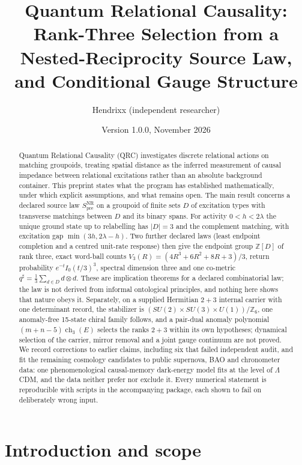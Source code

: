 \documentclass[11pt]{article}
\title{Quantum Relational Causality: Rank-Three Selection from a\\
Nested-Reciprocity Source Law, and Conditional Gauge Structure}
\author{Hendrixx (independent researcher)}
\date{Version 1.0.0, November 2026}
\theoremstyle{definition}
\theoremstyle{remark}
\newcommand{\Spre}{S^{\mathrm{NR}}_{\mathrm{pre}}}
\newcommand{\Z}{\mathbb{Z}}
\newcommand{\ch}{\operatorname{ch}}
\begin{document}
\maketitle

\begin{abstract}
Quantum Relational Causality (QRC) investigates discrete relational actions on matching
groupoids, treating spatial distance as the inferred measurement of causal impedance
between relational excitations rather than an absolute background container. This preprint
states what the program has established mathematically, under which explicit assumptions,
and what remains open. The main result concerns a declared source law $\Spre$ on a groupoid
of finite sets $D$ of excitation types with transverse matchings between $D$ and its binary
spans. For activity $0<h<2\lambda$ the unique ground state up to relabelling has $|D|=3$
and the complement matching, with excitation gap $\min(3h,2\lambda-h)$. Two further declared
laws (least endpoint completion and a centred unit-rate response) then give the endpoint group
$\Z[D]$ of rank three, exact word-ball counts $V_3(R)=(4R^3+6R^2+8R+3)/3$, return
probability $e^{-t}I_0(t/3)^3$, spectral dimension three and one co-metric
$q^\sharp=\tfrac13\sum_{d\in D}d\otimes d$. These are implication theorems for a declared
combinatorial law; the law is not derived from informal ontological principles, and nothing
here shows that nature obeys it. Separately, on a supplied Hermitian $2+3$ internal carrier
with one determinant record, the stabilizer is $(SU(2)\times SU(3)\times U(1))/\Z_6$, one
anomaly-free 15-state chiral family follows, and a pair-dual anomaly polynomial
$(m+n-5)\ch_3(E)$ selects the ranks $2+3$ within its own hypotheses; dynamical selection
of the carrier, mirror removal and a joint gauge continuum are not proved. We record
corrections to earlier claims, including six that failed independent audit, and fit the
remaining cosmology candidates to public supernova, BAO and chronometer data: one
phenomenological causal-memory dark-energy model fits at the level of $\Lambda$CDM, and
the data neither prefer nor exclude it. Every numerical statement is reproducible with
scripts in the accompanying package, each shown to fail on deliberately wrong input.
\end{abstract}

\section{Introduction and scope}
\label{sec:intro}
\end{document}
